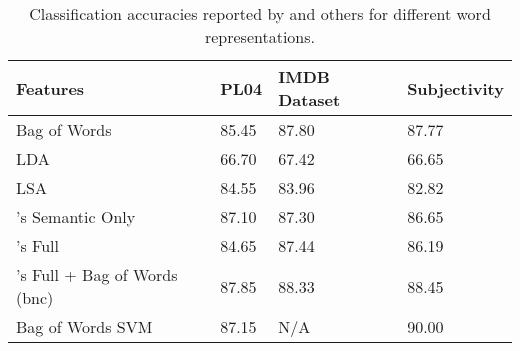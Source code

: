 \documentclass[a4paper,26pt]{article}
\begin{document}
\begin{table}[H]
\begin{tabular}{ | l | p{1.5cm} | p{2.5cm} | p{2.5cm} |  }
 \hline
 \textbf{Features} & \textbf{PL04} & \textbf{IMDB Dataset} & \textbf{Subjectivity} \\
 \hline
 Bag of Words   & 85.45 & 87.80 & 87.77 \\

 LDA & 66.70 & 67.42 & 66.65 \\

 LSA & 84.55 & 83.96 & 82.82 \\
 \cite{maas2011learning}'s Semantic Only & 87.10 & 87.30 & 86.65 \\

 \cite{maas2011learning}'s Full & 84.65 & 87.44 & 86.19 \\

 \cite{maas2011learning}'s Full + Bag of Words (bnc) & 87.85 & 88.33 & 88.45 \\
 Bag of Words SVM \cite{pang2004sentimental} & 87.15 & N/A & 90.00 \\
 \hline
\end{tabular}
\caption{Classification accuracies reported by \cite{maas2011learning} and others for different word representations.}
\label{table:1}
\end{table}
\end{document}
